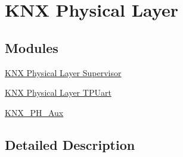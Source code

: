 \hypertarget{group___k_n_x___p_h}{}\section{K\+NX Physical Layer}
\label{group___k_n_x___p_h}
\subsection*{Modules}
\begin{DoxyCompactItemize}
\item 
\hyperlink{group___k_n_x___p_h___sup}{K\+N\+X Physical Layer Supervisor}
\item 
\hyperlink{group___k_n_x___p_h___t_p_uart}{K\+N\+X Physical Layer T\+P\+Uart}
\item 
\hyperlink{group___k_n_x___p_h___aux}{K\+N\+X\+\_\+\+P\+H\+\_\+\+Aux}
\end{DoxyCompactItemize}


\subsection{Detailed Description}
